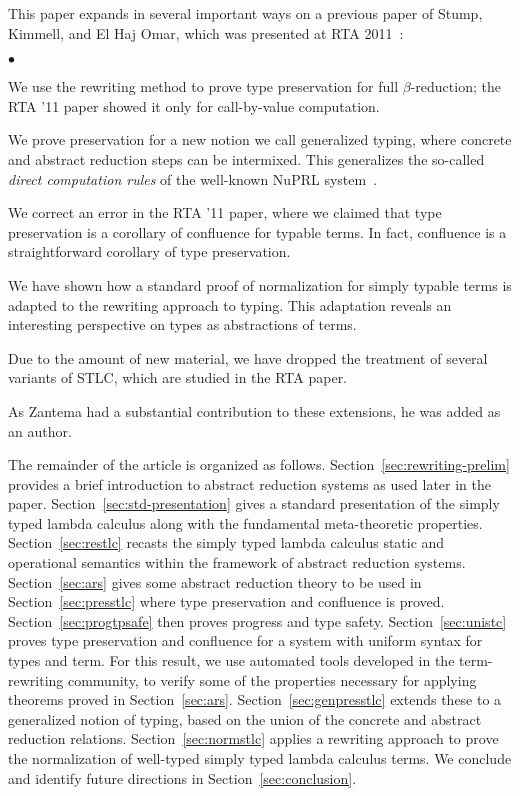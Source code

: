 \documentclass{LMCS}
\begin{document}
This paper expands in several important ways on a previous paper of
Stump, Kimmell, and El Haj Omar, which was presented at RTA 2011~\cite{stump+11}:
\begin{iteMize}{$\bullet$}
\item 
We use the rewriting method to prove type preservation for full
$\beta$-reduction; the RTA '11 paper showed it only for call-by-value
computation.
\item We prove preservation for a new notion we call generalized
  typing, where concrete and abstract reduction steps can be
  intermixed.  This generalizes the so-called \emph{direct computation
  rules} of the well-known NuPRL system~\cite{allen+06}.
\item We correct an error in the RTA '11 paper, where we claimed that
  type preservation is a corollary of confluence for typable terms.
  In fact, confluence is a straightforward corollary of type preservation.
\item We have shown how a standard proof of normalization for simply
  typable terms is adapted to the rewriting approach to typing.  This
  adaptation reveals an interesting perspective on types as
  abstractions of terms.
\item Due to the amount of new material, we have dropped the treatment
  of several variants of STLC, which are studied in the RTA paper.
\end{iteMize}
As Zantema had a substantial contribution to these extensions, he was
added as an author.  

The remainder of the article is organized as
follows. Section~\ref{sec:rewriting-prelim} provides a brief
introduction to abstract reduction systems as used later in the
paper. Section~\ref{sec:std-presentation} gives a standard
presentation of the simply typed lambda calculus along with the
fundamental meta-theoretic properties. Section~\ref{sec:restlc}
recasts the simply typed lambda calculus static and operational
semantics within the framework of abstract reduction systems.
Section~\ref{sec:ars} gives some abstract reduction theory to be used
in Section~\ref{sec:presstlc} where type preservation and confluence
is proved.  Section~\ref{sec:progtpsafe} then proves progress and type
safety.  Section~\ref{sec:unistc} proves type preservation and
confluence for a system with uniform syntax for types and term.  For
this result, we use automated tools developed in the term-rewriting
community, to verify some of the properties necessary for applying
theorems proved in Section~\ref{sec:ars}.
Section~\ref{sec:genpresstlc} extends these to a generalized notion of
typing, based on the union of the concrete and abstract reduction
relations.  Section~\ref{sec:normstlc} applies a rewriting approach to
prove the normalization of well-typed simply typed lambda calculus
terms. We conclude and identify future directions in
Section~\ref{sec:conclusion}.
\end{document}
